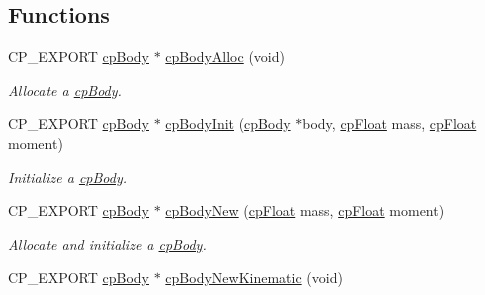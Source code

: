 \subsection*{Functions}
\begin{DoxyCompactItemize}
\item 
\mbox{\label{group__cp_body_gab0a8b6afcd8468017a858b465e2add2a}} 
C\+P\+\_\+\+E\+X\+P\+O\+RT \mbox{\hyperlink{structcp_body}{cp\+Body}} $\ast$ \mbox{\hyperlink{group__cp_body_gab0a8b6afcd8468017a858b465e2add2a}{cp\+Body\+Alloc}} (void)
\begin{DoxyCompactList}\small\item\em Allocate a \mbox{\hyperlink{structcp_body}{cp\+Body}}. \end{DoxyCompactList}\item 
\mbox{\label{group__cp_body_ga78d4405017bd20418ae9e8dc6a081184}} 
C\+P\+\_\+\+E\+X\+P\+O\+RT \mbox{\hyperlink{structcp_body}{cp\+Body}} $\ast$ \mbox{\hyperlink{group__cp_body_ga78d4405017bd20418ae9e8dc6a081184}{cp\+Body\+Init}} (\mbox{\hyperlink{structcp_body}{cp\+Body}} $\ast$body, \mbox{\hyperlink{group__basic_types_gac1ed65573e035bf892505768c852d8d3}{cp\+Float}} mass, \mbox{\hyperlink{group__basic_types_gac1ed65573e035bf892505768c852d8d3}{cp\+Float}} moment)
\begin{DoxyCompactList}\small\item\em Initialize a \mbox{\hyperlink{structcp_body}{cp\+Body}}. \end{DoxyCompactList}\item 
\mbox{\label{group__cp_body_gaef447a337f267c19060a9d80e4edd7b8}} 
C\+P\+\_\+\+E\+X\+P\+O\+RT \mbox{\hyperlink{structcp_body}{cp\+Body}} $\ast$ \mbox{\hyperlink{group__cp_body_gaef447a337f267c19060a9d80e4edd7b8}{cp\+Body\+New}} (\mbox{\hyperlink{group__basic_types_gac1ed65573e035bf892505768c852d8d3}{cp\+Float}} mass, \mbox{\hyperlink{group__basic_types_gac1ed65573e035bf892505768c852d8d3}{cp\+Float}} moment)
\begin{DoxyCompactList}\small\item\em Allocate and initialize a \mbox{\hyperlink{structcp_body}{cp\+Body}}. \end{DoxyCompactList}\item 
\mbox{\label{group__cp_body_gacc49a0d0a771a8d873ccd7ee4106e9f4}} 
C\+P\+\_\+\+E\+X\+P\+O\+RT \mbox{\hyperlink{structcp_body}{cp\+Body}} $\ast$ \mbox{\hyperlink{group__cp_body_gacc49a0d0a771a8d873ccd7ee4106e9f4}{cp\+Body\+New\+Kinematic}} (void)

\end{DoxyCompactItemize}
